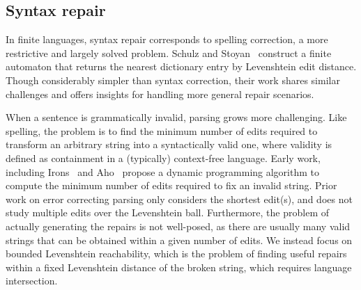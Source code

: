\documentclass[sigplan,review,anonymous,acmsmall]{acmart}\settopmatter{printfolios=false,printccs=false,printacmref=false}
\begin{document}
\subsection{Syntax repair}

In finite languages, syntax repair corresponds to spelling correction, a more restrictive and largely solved problem. Schulz and Stoyan~\cite{schulz2002fast} construct a finite automaton that returns the nearest dictionary entry by Levenshtein edit distance. Though considerably simpler than syntax correction, their work shares similar challenges and offers insights for handling more general repair scenarios.

When a sentence is grammatically invalid, parsing grows more challenging. Like spelling, the problem is to find the minimum number of edits required to transform an arbitrary string into a syntactically valid one, where validity is defined as containment in a (typically) context-free language. Early work, including Irons~\cite{irons1963error} and Aho~\cite{aho1972minimum} propose a dynamic programming algorithm to compute the minimum number of edits required to fix an invalid string. Prior work on error correcting parsing only considers the shortest edit(s), and does not study multiple edits over the Levenshtein ball. Furthermore, the problem of actually generating the repairs is not well-posed, as there are usually many valid strings that can be obtained within a given number of edits. We instead focus on bounded Levenshtein reachability, which is the problem of finding useful repairs within a fixed Levenshtein distance of the broken string, which requires language intersection.


\end{document}
